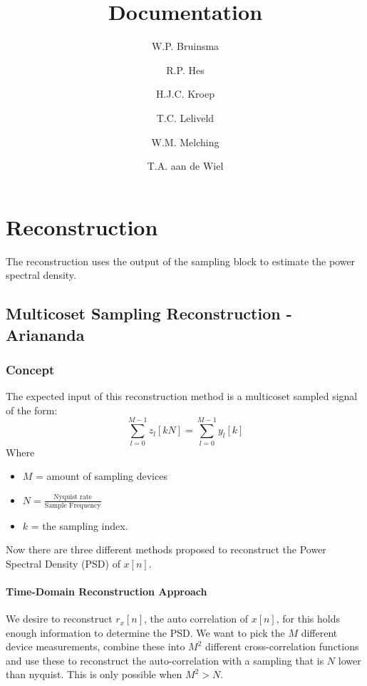 \documentclass[report, oneside, a4paper, openany]{memoir}
\title{Documentation}
\author{W.P. Bruinsma \and R.P. Hes \and H.J.C. Kroep \and T.C. Leliveld \and W.M. Melching \and T.A. aan de Wiel}
\begin{document}
\chapter{Reconstruction}
The reconstruction uses the output of the sampling block to estimate the power spectral density.

\section{Multicoset Sampling Reconstruction -Ariananda}
\subsection{Concept}
The expected input of this reconstruction method is a multicoset sampled signal of the form:
$$
\sum_{l=0}^{M-1}z_l[kN] = \sum_{l=0}^{M-1}y_l[k]
$$
Where
\begin{itemize}
\item $M$  = amount of sampling devices
\item $N = \frac{\text{Nyquist rate}}{\text{Sample Frequency}}$
\item $k$ = the sampling index.
\end{itemize}

Now there are three different methods proposed to reconstruct the Power Spectral Density (PSD) of $x[n]$.

\subsubsection{Time-Domain Reconstruction Approach}
We desire to reconstruct $r_x[n]$, the auto correlation of $x[n]$, for this holds enough information to determine the PSD.
We want to pick the $M$ different device measurements, combine these into $M^2$ different cross-correlation functions and use these to reconstruct the auto-correlation with a sampling that is $N$ lower than nyquist. 
This is only possible when $M^2>N$.
\end{document}
